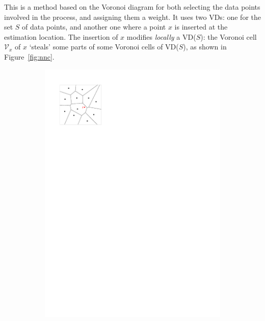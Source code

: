 This is a method based on the Voronoi diagram for both selecting the data points involved in the process, and assigning them a weight.  
It uses two VDs: one for the set $S$ of data points, and another one where a point $x$ is inserted at the estimation location. 
The insertion of $x$ modifies \emph{locally} a VD($S$): the Voronoi cell $\mathcal{V}_{x}$ of $x$ `steals' some parts of some Voronoi cells of VD($S$), as shown in Figure~\ref{fig:nnc}.
\begin{figure}
  \centering
  \begin{subfigure}[b]{0.3\linewidth}
    \centering
    \includegraphics[width=\textwidth,page=1]{figs/laplace.pdf}
    \caption{}\label{fig:nn-a}
  \end{subfigure}%
  \begin{subfigure}[b]{0.3\linewidth}
    \centering

\end{subfigure}
\end{figure}
